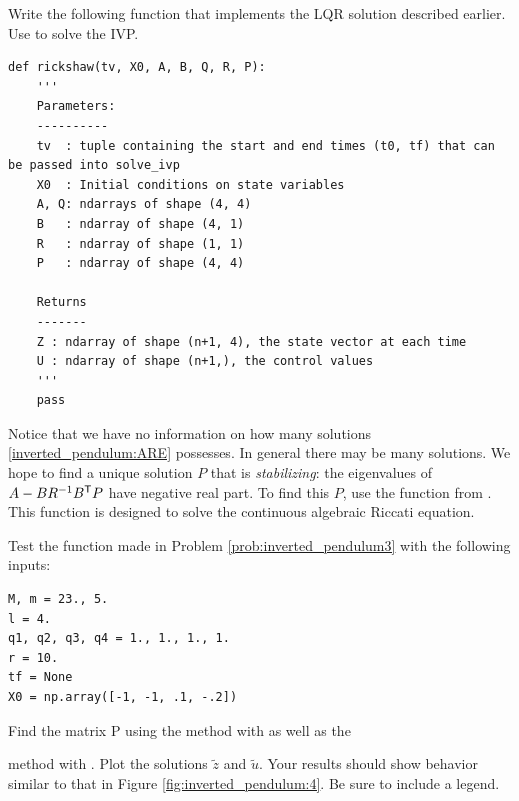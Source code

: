 \begin{problem}
	Write the following function that implements the LQR solution described earlier.
	Use  to solve the IVP.
\begin{lstlisting}
def rickshaw(tv, X0, A, B, Q, R, P):
	'''
	Parameters:
	----------
	tv 	: tuple containing the start and end times (t0, tf) that can be passed into solve_ivp
	X0 	: Initial conditions on state variables
	A, Q: ndarrays of shape (4, 4)
	B	: ndarray of shape (4, 1)
	R	: ndarray of shape (1, 1)
	P	: ndarray of shape (4, 4)

	Returns
	-------
	Z : ndarray of shape (n+1, 4), the state vector at each time
	U : ndarray of shape (n+1,), the control values
	'''
	pass
\end{lstlisting}
\label{prob:inverted_pendulum3}
\end{problem}


Notice that we have no information on how many solutions \eqref{inverted_pendulum:ARE} possesses.
In general there may be many solutions.
We hope to find a unique solution $P$ that is \textit{stabilizing}: the eigenvalues of $A - BR^{-1}B^{\mathsf T} P$ have negative real part.
To find this $P$, use the function  from .
This function is designed to solve the continuous algebraic Riccati equation.


\begin{problem}
Test the function made in Problem \eqref{prob:inverted_pendulum3} with the following inputs:
\begin{lstlisting}
M, m = 23., 5.
l = 4.
q1, q2, q3, q4 = 1., 1., 1., 1.
r = 10.
tf = None
X0 = np.array([-1, -1, .1, -.2])
\end{lstlisting}
Find the matrix P using the  method with  as well as the

\noindent {} method with .
Plot the solutions $\tilde{z}$ and $\tilde{u}$.
Your results should show behavior similar to that in Figure \ref{fig:inverted_pendulum:4}.
Be sure to include a legend.
\label{prob:inverted_pendulum:4}
\end{problem}

